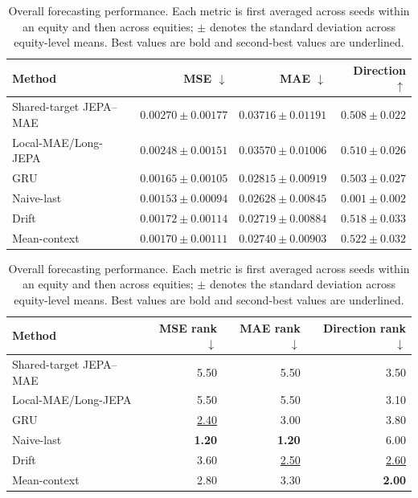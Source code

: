 \begin{table}[t]
\centering
\small
\caption{Overall forecasting performance. Each metric is first averaged across seeds within an equity and then across equities; $\pm$ denotes the standard deviation across equity-level means. Best values are bold and second-best values are underlined.}
\label{tab:main_metrics}
\begin{tabular}{lrrr}
\toprule
Method & MSE $\downarrow$ & MAE $\downarrow$ & Direction $\uparrow$ \\
\midrule
Shared-target JEPA--MAE & $0.00270 \pm 0.00177$ & $0.03716 \pm 0.01191$ & $0.508 \pm 0.022$ \\
Local-MAE/Long-JEPA & $0.00248 \pm 0.00151$ & $0.03570 \pm 0.01006$ & $0.510 \pm 0.026$ \\
GRU & \underline{$0.00165 \pm 0.00105$} & $0.02815 \pm 0.00919$ & $0.503 \pm 0.027$ \\
Naive-last & \textbf{$0.00153 \pm 0.00094$} & \textbf{$0.02628 \pm 0.00845$} & $0.001 \pm 0.002$ \\
Drift & $0.00172 \pm 0.00114$ & \underline{$0.02719 \pm 0.00884$} & \underline{$0.518 \pm 0.033$} \\
Mean-context & $0.00170 \pm 0.00111$ & $0.02740 \pm 0.00903$ & \textbf{$0.522 \pm 0.032$} \\
\bottomrule
\end{tabular}
\par\medskip
\begin{tabular}{lrrr}
\toprule
Method & MSE rank $\downarrow$ & MAE rank $\downarrow$ & Direction rank $\downarrow$ \\
\midrule
Shared-target JEPA--MAE & 5.50 & 5.50 & 3.50 \\
Local-MAE/Long-JEPA & 5.50 & 5.50 & 3.10 \\
GRU & \underline{2.40} & 3.00 & 3.80 \\
Naive-last & \textbf{1.20} & \textbf{1.20} & 6.00 \\
Drift & 3.60 & \underline{2.50} & \underline{2.60} \\
Mean-context & 2.80 & 3.30 & \textbf{2.00} \\
\bottomrule
\end{tabular}
\end{table}

